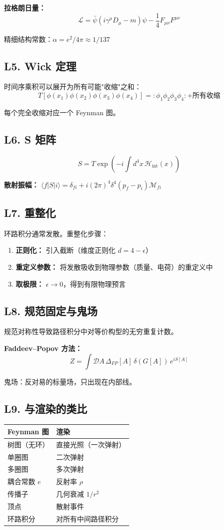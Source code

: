 \textbf{拉格朗日量：}
\[
\mathcal{L} = \bar{\psi}(i\gamma^\mu D_\mu - m)\psi - \frac{1}{4}F_{\mu\nu}F^{\mu\nu}
\]

精细结构常数：$\alpha = e^2/4\pi \approx 1/137$

\subsection{L5. Wick 定理}

时间序乘积可以展开为所有可能"收缩"之和：
\[
T[\phi(x_1)\phi(x_2)\phi(x_3)\phi(x_4)] = :\phi_1\phi_2\phi_3\phi_4: + \text{所有收缩}
\]

每个完全收缩对应一个 Feynman 图。

\subsection{L6. S 矩阵}

\[
S = T\exp\left(-i\int d^4x\, \mathcal{H}_{\text{int}}(x)\right)
\]

\textbf{散射振幅：} $\langle f|S|i\rangle = \delta_{fi} + i(2\pi)^4\delta^4(p_f - p_i)\mathcal{M}_{fi}$

\subsection{L7. 重整化}

环路积分通常发散。重整化步骤：
\begin{enumerate}
  \item \textbf{正则化：} 引入截断（维度正则化 $d = 4-\epsilon$）
  \item \textbf{重定义参数：} 将发散吸收到物理参数（质量、电荷）的重定义中
  \item \textbf{取极限：} $\epsilon \to 0$，得到有限物理预言
\end{enumerate}

\subsection{L8. 规范固定与鬼场}

规范对称性导致路径积分中对等价构型的无穷重复计数。

\textbf{Faddeev--Popov 方法：}
\[
Z = \int \mathcal{D}A\,\Delta_{FP}[A]\,\delta(G[A])\,e^{iS[A]}
\]

鬼场：反对易的标量场，只出现在内部线。

\subsection{L9. 与渲染的类比}

\begin{center}
\begin{tabular}{ll}
\toprule
\textbf{Feynman 图} & \textbf{渲染} \\
\midrule
树图（无环） & 直接光照（一次弹射） \\
单圈图 & 二次弹射 \\
多圈图 & 多次弹射 \\
耦合常数 $e$ & 反射率 $\rho$ \\
传播子 & 几何衰减 $1/r^2$ \\
顶点 & 散射事件 \\
环路积分 & 对所有中间路径积分 \\
\bottomrule
\end{tabular}
\end{center}